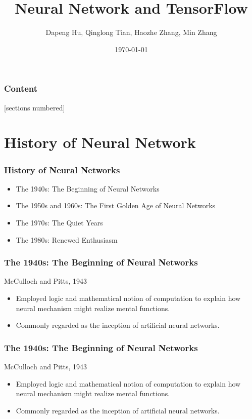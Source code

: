 \documentclass{beamer}
\title{Neural Network and TensorFlow}
\date{\today}
\author{Dapeng Hu, Qinglong Tian, Haozhe Zhang, Min Zhang}
\institute{STAT 580 Statistical Computing\\Department of Statistics\\ Iowa State University}
\begin{document}
\maketitle


\begin{frame}
\frametitle{Content}
[sections numbered]
\tableofcontents[hideallsubsections]
\end{frame}




\section{History of Neural Network}

\begin{frame}
	\frametitle{History of Neural Networks}
\begin{itemize}
	\item The 1940s: The Beginning of Neural Networks
\item The 1950s and 1960s: The First Golden Age of
Neural Networks
\item The 1970s: The Quiet Years
\item The 1980s: Renewed Enthusiasm
\end{itemize}
\end{frame}

\begin{frame}
	\frametitle{The 1940s: The Beginning of Neural Networks}
	McCulloch and Pitts, 1943
	\begin{itemize}
		\item Employed logic and mathematical notion of
		computation to explain how neural mechanism
		might realize mental functions.
		\item Commonly regarded as the inception of artificial
		neural networks.
	\end{itemize}
\end{frame}

\begin{frame}
	\frametitle{The 1940s: The Beginning of Neural Networks}
	McCulloch and Pitts, 1943
	\begin{itemize}
		\item Employed logic and mathematical notion of
		computation to explain how neural mechanism
		might realize mental functions.
		\item Commonly regarded as the inception of artificial
		neural networks.
	\end{itemize}
\end{frame}
\end{document}
